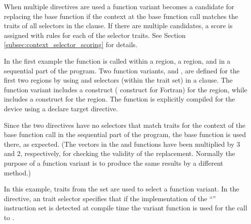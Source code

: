 When multiple  directives are used 
a function variant becomes a candidate for replacing the base function if the
context at the base function call matches the traits of all selectors in the  clause.
If there are multiple candidates, a score is assigned with rules for each
of the selector traits. 
See Section \ref{subsec:context_selector_scoring} for details.

In the first example the  function is called within a  region,
a  region, and in a sequential part of the program.  Two function variants,  and ,
are defined for the first two regions by using  and  selectors (within
the  trait set) in a  clause.  The  function variant includes
a  construct ( construct for Fortran) for the  region, 
while  includes a  construct for the  region.
The  function is explicitly compiled for the device using a declare target directive.

Since the two  directives have no selectors that match traits for the context
of the base function call in the sequential part of the program, the base  function is used there, 
as expected.
(The vectors in the  and  functions have been multiplied
by 3 and 2, respectively, for checking the validity of the replacement. Normally
the purpose of a function variant is to produce the same results by a different method.)




In this example, traits from the  set are used to select a function variant.
In the  directive, an  trait selector
specifies that if the implementation of the ``''
instruction set is detected at compile time the 
variant function is used for the call to .  

